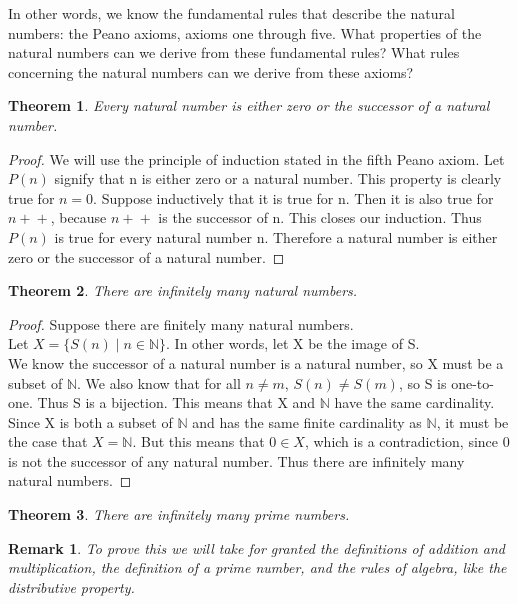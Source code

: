 \documentclass{article}
\newtheorem{theorem}{Theorem}
\newtheorem{remark}{Remark}
\newcommand{\inc}[1]{\mathrel{{{#1}+}+}}
\begin{document}
In other words, we know the fundamental rules that describe the natural numbers: the Peano axioms, axioms one through five. What properties of the natural numbers can we derive from these fundamental rules? What rules concerning the natural numbers can we derive from these axioms?

\begin{theorem}
Every natural number is either zero or the successor of a natural number.
\end{theorem}

\begin{proof}
We will use the principle of induction stated in the fifth Peano axiom. Let $P(n)$ signify that n is either zero or a natural number. This property is clearly true for $n = 0$. Suppose inductively that it is true for n. Then it is also true for $\inc{n}$, because $\inc{n}$ is the successor of n. This closes our induction. Thus $P(n)$ is true for every natural number n. Therefore a natural number is either zero or the successor of a natural number.
\end{proof}

\begin{theorem}
There are infinitely many natural numbers. 
\end{theorem}

\begin{proof}
Suppose there are finitely many natural numbers.\\

Let $X = \{S(n) \mid n \in \mathbb{N}\}$. In other words, let X be the image of S. \\

We know the successor of a natural number is a natural number, so X must be a subset of $\mathbb{N}$. We also know that for all $n \neq m$, $S(n) \neq S(m)$, so S is one-to-one. Thus S is a bijection. This means that X and $\mathbb{N}$ have the same cardinality. Since X is both a subset of $\mathbb{N}$ and has the same finite cardinality as $\mathbb{N}$, it must be the case that $X = \mathbb{N}$. But this means that $0 \in X$, which is a contradiction, since 0 is not the successor of any natural number. Thus there are infinitely many natural numbers.
\end{proof}

\begin{theorem}
There are infinitely many prime numbers.
\end{theorem}

\begin{remark}
To prove this we will take for granted the definitions of addition and multiplication, the definition of a prime number, and the rules of algebra, like the distributive property.
\end{remark}
\end{document}
